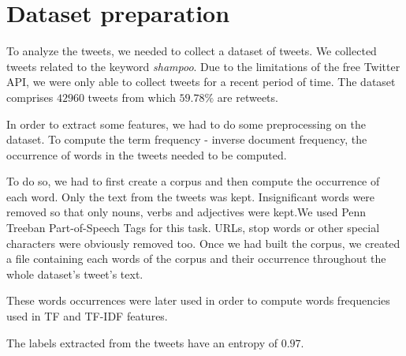 \section{Dataset preparation}
\label{sec:dataset}

To analyze the tweets, we needed to collect a dataset of tweets.
We collected tweets related to the keyword \textit{shampoo}. Due to the
limitations of the free Twitter API, we were only able to collect tweets for a
recent period of time. The dataset comprises $42960$ tweets from which 
$59.78\%$ are retweets.

In order to extract some features, we had to do some preprocessing on the
dataset. To compute the term frequency - inverse document frequency, the
occurrence of words in the tweets needed to be computed.

To do so, we had to first create a corpus and then compute the occurrence of
each word. Only the text from the tweets was kept. Insignificant words were 
removed so that only nouns, verbs and adjectives were kept.We used Penn Treeban 
Part-of-Speech Tags for this task.  URLs, stop words or other special 
characters were obviously removed too. Once we had built the corpus, we created 
a file containing each words of the corpus and their occurrence throughout the 
whole dataset's tweet's text.

These words occurrences were later used in order to compute words frequencies 
used in TF and TF-IDF features.

The labels extracted from the tweets have an entropy of $0.97$.
